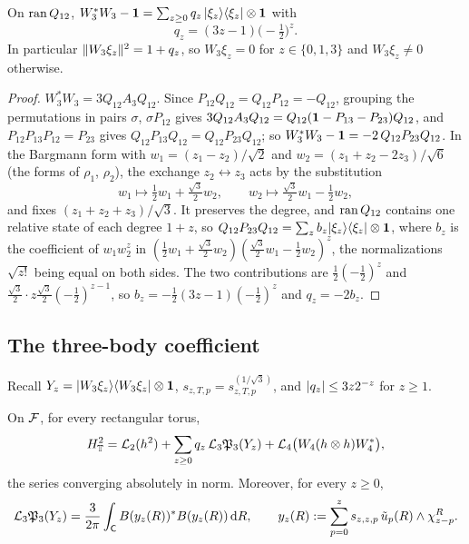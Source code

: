 \begin{lemma}\label{lem:qz}
On $\operatorname{ran} Q_{12}$, $W_3^*W_3-\mathbf{1}=\sum_{z\ge0}q_z\,\lvert \xi_z\rangle\langle \xi_z\rvert\otimes\mathbf{1}$ with
\[
q_z=(3z-1)\bigl(-\tfrac12\bigr)^z .
\]
In particular $\lVert W_3\xi_z\rVert^2=1+q_z$, so $W_3\xi_z=0$ for $z\in\{0,1,3\}$ and $W_3\xi_z\neq0$ otherwise.
\end{lemma}

\begin{proof}
$W_3^*W_3=3Q_{12}A_3Q_{12}$. Since $P_{12}Q_{12}=Q_{12}P_{12}=-Q_{12}$, grouping the permutations in pairs $\sigma$, $\sigma P_{12}$ gives
$3Q_{12}A_3Q_{12}=Q_{12}(\mathbf{1}-P_{13}-P_{23})Q_{12}$, and $P_{12}P_{13}P_{12}=P_{23}$ gives $Q_{12}P_{13}Q_{12}=Q_{12}P_{23}Q_{12}$; so
$W_3^*W_3-\mathbf{1}=-2\,Q_{12}P_{23}Q_{12}$. In the Bargmann form with $w_1=(z_1-z_2)/\sqrt2$ and $w_2=(z_1+z_2-2z_3)/\sqrt6$ (the forms of $\rho_1$,
$\rho_2$), the exchange $z_2\leftrightarrow z_3$ acts by the substitution
\[
w_1\mapsto\tfrac12w_1+\tfrac{\sqrt3}2w_2,\qquad w_2\mapsto\tfrac{\sqrt3}2w_1-\tfrac12w_2,
\]
and fixes $(z_1+z_2+z_3)/\sqrt3$. It preserves the degree, and $\operatorname{ran} Q_{12}$ contains one relative state of each degree $1+z$, so
$Q_{12}P_{23}Q_{12}=\sum_zb_z\lvert \xi_z\rangle\langle \xi_z\rvert\otimes\mathbf{1}$, where $b_z$ is the coefficient of $w_1w_2^z$ in
$(\frac12w_1+\frac{\sqrt3}2w_2)(\frac{\sqrt3}2w_1-\frac12w_2)^z$, the normalizations $\sqrt{z!}$ being equal on both sides. The two
contributions are $\frac12(-\frac12)^z$ and $\frac{\sqrt3}2\cdot z\frac{\sqrt3}2(-\frac12)^{z-1}$, so $b_z=-\frac12(3z-1)(-\frac12)^z$ and $q_z=-2b_z$.
\end{proof}

\subsection{The three-body coefficient}

Recall $Y_z=\lvert W_3\xi_z\rangle\langle W_3\xi_z\rvert\otimes\mathbf{1}$, $s_{z,T,p}=s^{(1/\sqrt3)}_{z,T,p}$, and $\lvert q_z\rvert\le3z2^{-z}$ for $z\ge1$.

\begin{theorem}\label{thm:square}
On $\mathcal{F}$, for every rectangular torus,
\begin{equation}\label{eq:squareHT}
H_{\mathbb{T}}^2=\mathcal{L}_2(h^2)+\sum_{z\ge0}q_z\,\mathcal{L}_3\mathfrak{P}_3(Y_z)+\mathcal{L}_4\bigl(W_4(h\otimes h)W_4^*\bigr),
\end{equation}
the series converging absolutely in norm. Moreover, for every $z\ge0$,
\begin{equation}\label{eq:yz}
\mathcal{L}_3\mathfrak{P}_3(Y_z)=\frac3{2\pi}\int_{\mathsf{C}} B(y_z(R))^*B(y_z(R))\,\mathrm{d} R,\qquad y_z(R):=\sum_{p=0}^zs_{z,z,p}\,\tilde u_p(R)\wedge\chi_{z-p}^R .
\end{equation}
\end{theorem}

